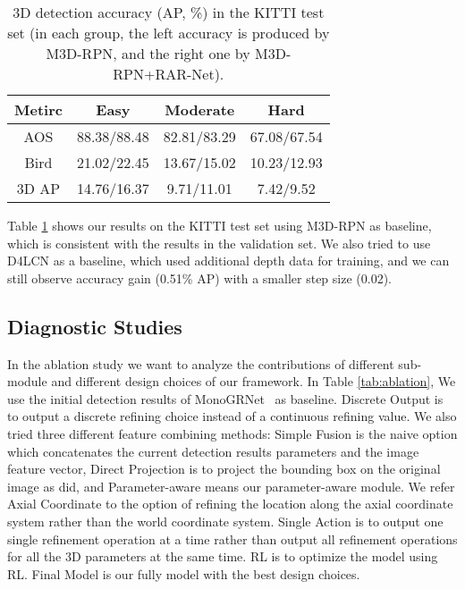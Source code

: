 \documentclass[runningheads]{llncs}
\begin{document}
\begin{table}[t]
\caption{3D detection accuracy (AP, \%) in the KITTI test set (in each group, the left accuracy is produced by M3D-RPN, and the right one by M3D-RPN+RAR-Net).}
\begin{center}
\begin{tabular}{|c|c|c|c|}
\hline
Metirc &  Easy & Moderate& Hard \\
\hline\hline
AOS &	   88.38/88.48 & 82.81/83.29 & 67.08/67.54\\
\hline
Bird &	21.02/22.45 & 13.67/15.02 & 10.23/12.93\\
\hline
3D AP & 14.76/16.37 & 9.71/11.01 & 7.42/9.52\\
\hline
\end{tabular}
\end{center}
\label{tab:dimension2}
\end{table}

Table \ref{tab:dimension2} shows our results on the KITTI test set using M3D-RPN as baseline, which is consistent with the results in the validation set. We also tried to use D4LCN\cite{ding2020learning} as a baseline, which used additional depth data for training, and we can still observe accuracy gain (0.51\% AP) with a smaller step size (0.02).


\subsection{Diagnostic Studies} In the ablation study we want to analyze the contributions of different sub-module and different design choices of our framework. In Table \ref{tab:ablation}, We use the initial detection results of MonoGRNet~\cite{qin2019monogrnet} as baseline. \textsf{Discrete Output} is to output a discrete refining choice instead of a continuous refining value. We also tried three different feature combining methods: \textsf{Simple Fusion} is the naive option which concatenates the current detection results parameters and the image feature vector, \textsf{Direct Projection} is to project the bounding box on the original image as \cite{liu2019deep} did, and \textsf{Parameter-aware} means our parameter-aware module. We refer \textsf{Axial Coordinate} to the option of refining the location along the axial coordinate system rather than the world coordinate system. \textsf{Single Action} is to output one single refinement operation at a time rather than output all refinement operations for all the 3D parameters at the same time. \textsf{RL} is to optimize the model using RL. \textsf{Final Model} is our fully model with the best design choices.
\end{document}
